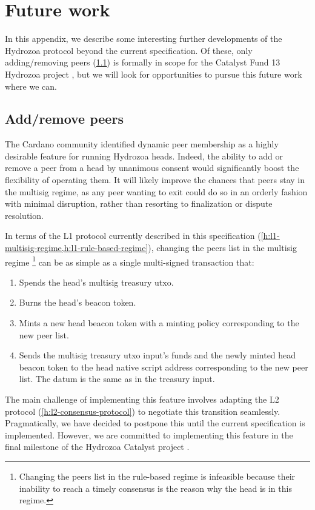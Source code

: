 \documentclass[../hydrozoa.tex]{subfiles}
\begin{document}
\chapter{Future work}%
\label{h:future-work}%

In this appendix, we describe some interesting further developments of the Hydrozoa protocol beyond the current specification.
Of these, only adding/removing peers (\cref{h:future-work-add-remove-members}) is formally in scope for the Catalyst Fund 13 Hydrozoa project \citep{FlerovskyCatalystMilestonesHydrozoa2024}, but we will look for opportunities to pursue this future work where we can.

\section{Add/remove peers}%
\label{h:future-work-add-remove-members}%

The Cardano community identified dynamic peer membership as a highly desirable feature for running Hydrozoa heads.
Indeed, the ability to add or remove a peer from a head by unanimous consent would significantly boost the flexibility of operating them.
It will likely improve the chances that peers stay in the multisig regime, as any peer wanting to exit could do so in an orderly fashion with minimal disruption, rather than resorting to finalization or dispute resolution.

In terms of the L1 protocol currently described in this specification (\cref{h:l1-multisig-regime,h:l1-rule-based-regime}), changing the peers list in the multisig regime%
  \footnote{Changing the peers list in the rule-based regime is infeasible because their inability to reach a timely consensus is the reason why the head is in this regime.}
  can be as simple as a single multi-signed transaction that:
\begin{enumerate}
  \item Spends the head's multisig treasury utxo.  
  \item Burns the head's beacon token.
  \item Mints a new head beacon token with a minting policy corresponding to the new peer list.
  \item Sends the multisig treasury utxo input's funds and the newly minted head beacon token to the head native script address corresponding to the new peer list.
    The datum is the same as in the treasury input.
\end{enumerate}

The main challenge of implementing this feature involves adapting the L2 protocol (\cref{h:l2-consensus-protocol}) to negotiate this transition seamlessly.
Pragmatically, we have decided to postpone this until the current specification is implemented.
However, we are committed to implementing this feature in the final milestone of the Hydrozoa Catalyst project \citep{FlerovskyCatalystMilestonesHydrozoa2024}.
\end{document}
